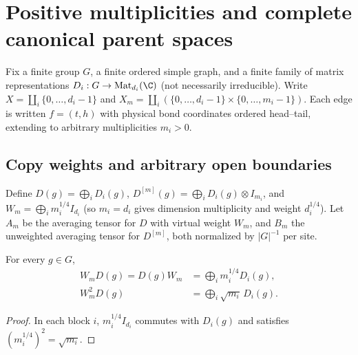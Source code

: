 \section{Positive multiplicities and complete canonical parent spaces}
\label{sec:peps_copy_parent_transport}

Fix a finite group $G$, a finite ordered simple graph, and a finite family of matrix representations $D_i:G\to\operatorname{Mat}_{d_i}(\C)$ (not necessarily irreducible). Write $X=\coprod_i\{0,\ldots,d_i-1\}$ and $X_m=\coprod_i(\{0,\ldots,d_i-1\}\times\{0,\ldots,m_i-1\})$. Each edge is written $f=(t,h)$ with physical bond coordinates ordered head--tail, extending \cite[Section~7]{Schuch2010PEPS} to arbitrary multiplicities $m_i>0$.

\subsection{Copy weights and arbitrary open boundaries}

\begin{definition}%
    \label{def:peps_copy_representation}
    \leanok
    Define $D(g)=\bigoplus_iD_i(g)$,
    $D^{[m]}(g)=\bigoplus_iD_i(g)\otimes I_{m_i}$, and
    $W_m=\bigoplus_i m_i^{1/4}I_{d_i}$ (so $m_i=d_i$ gives dimension multiplicity and weight $d_i^{1/4}$).
    Let $A_m$ be the averaging tensor for $D$ with virtual weight $W_m$, and $B_m$ the unweighted averaging tensor for $D^{[m]}$, both normalized by $|G|^{-1}$ per site.
\end{definition}

\begin{lemma}%
    \label{thm:peps_copy_weight_products}
    \leanok
    For every $g\in G$,
    \begin{align}
        W_mD(g)=D(g)W_m & =\bigoplus_i m_i^{1/4}D_i(g),   \\
        W_m^2D(g)       & =\bigoplus_i\sqrt{m_i}\,D_i(g).
        \label{eq:peps_copy_weight_products}
    \end{align}
\end{lemma}
\begin{proof}\leanok
    In each block $i$, $m_i^{1/4}I_{d_i}$ commutes with $D_i(g)$ and satisfies $(m_i^{1/4})^2=\sqrt{m_i}$.
\end{proof}

